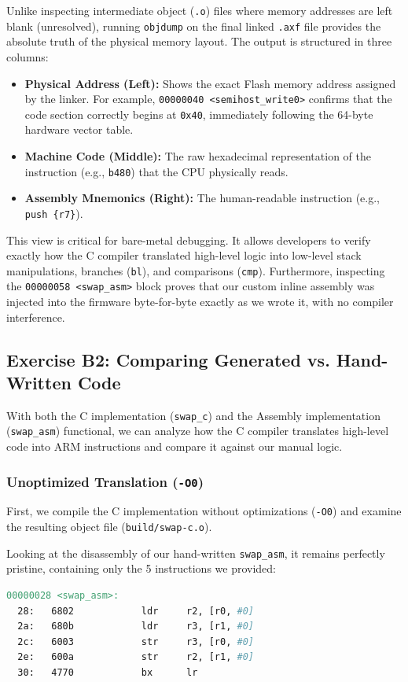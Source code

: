 Unlike inspecting intermediate object (\texttt{.o}) files where memory addresses are left blank (unresolved), running \texttt{objdump} on the final linked \texttt{.axf} file provides the absolute truth of the physical memory layout. The output is structured in three columns:

\begin{itemize}
    \item \textbf{Physical Address (Left):} Shows the exact Flash memory address assigned by the linker. For example, \texttt{00000040 <semihost\_write0>} confirms that the code section correctly begins at \texttt{0x40}, immediately following the 64-byte hardware vector table.
    \item \textbf{Machine Code (Middle):} The raw hexadecimal representation of the instruction (e.g., \texttt{b480}) that the CPU physically reads.
    \item \textbf{Assembly Mnemonics (Right):} The human-readable instruction (e.g., \texttt{push \{r7\}}). 
\end{itemize}

This view is critical for bare-metal debugging. It allows developers to verify exactly how the C compiler translated high-level logic into low-level stack manipulations, branches (\texttt{bl}), and comparisons (\texttt{cmp}). Furthermore, inspecting the \texttt{00000058 <swap\_asm>} block proves that our custom inline assembly was injected into the firmware byte-for-byte exactly as we wrote it, with no compiler interference.

\subsection{Exercise B2: Comparing Generated vs. Hand-Written Code}
With both the C implementation (\texttt{swap\_c}) and the Assembly implementation (\texttt{swap\_asm}) functional, we can analyze how the C compiler translates high-level code into ARM instructions and compare it against our manual logic.

\subsubsection{Unoptimized Translation (\texttt{-O0})}
First, we compile the C implementation without optimizations (\texttt{-O0}) and examine the resulting object file (\texttt{build/swap-c.o}).

Looking at the disassembly of our hand-written \texttt{swap\_asm}, it remains perfectly pristine, containing only the 5 instructions we provided:
\begin{lstlisting}[language=make]
00000028 <swap_asm>:
  28:   6802            ldr     r2, [r0, #0]
  2a:   680b            ldr     r3, [r1, #0]
  2c:   6003            str     r3, [r0, #0]
  2e:   600a            str     r2, [r1, #0]
  30:   4770            bx      lr
\end{lstlisting}


